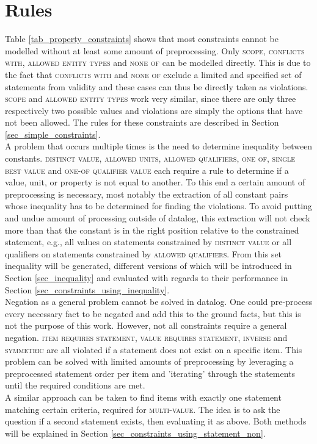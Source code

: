 \documentclass[hyperref,bachelorofscience,fleqn]{cgvpub}
\begin{document}
\section{Rules}
Table \ref{tab_property_constraints} shows that most constraints cannot be modelled without at least some amount of preprocessing. Only \textsc{scope}, \textsc{conflicts with}, \textsc{allowed entity types} and \textsc{none of} can be modelled directly. This is due to the fact that \textsc{conflicts with} and \textsc{none of} exclude a limited and specified set of statements from validity and these cases can thus be directly taken as violations. \textsc{scope} and \textsc{allowed entity types} work very similar, since there are only three respectively two possible values and violations are simply the options that have not been allowed. The rules for these constraints are described in Section \ref{sec_simple_constraints}.\\

A problem that occurs multiple times is the need to determine inequality between constants. \textsc{distinct value}, \textsc{allowed units}, \textsc{allowed qualifiers}, \textsc{one of}, \textsc{single best value} and \textsc{one-of qualifier value} each require a rule to determine if a value, unit, or property is not equal to another. To this end a certain amount of preprocessing is necessary, most notably the extraction of all constant pairs whose inequality has to be determined for finding the violations. To avoid putting and undue amount of processing outside of datalog, this extraction will not check more than that the constant is in the right position relative to the constrained statement, e.g., all values on statements constrained by \textsc{distinct value} or all qualifiers on statements constrained by \textsc{allowed qualifiers}. From this set inequality will be generated, different versions of which will be introduced in Section \ref{sec_inequality} and evaluated with regards to their performance in Section \ref{sec_constraints_using_inequality}.\\

Negation as a general problem cannot be solved in datalog. One could pre-process every necessary fact to be negated and add this to the ground facts, but this is not the purpose of this work. However, not all constraints require a general negation. \textsc{item requires statement}, \textsc{value requires statement}, \textsc{inverse }and \textsc{symmetric} are all violated if a statement does not exist on a specific item. This problem can be solved with limited amounts of preprocessing by leveraging a preprocessed statement order per item and 'iterating' through the statements until the required conditions are met.\\
A similar approach can be taken to find items with exactly one statement matching certain criteria, required for 	\textsc{multi-value}. The idea is to ask the question if a second statement exists, then evaluating it as above. Both methods will be explained in Section \ref{sec_constraints_using_statement_non}.
\end{document}

